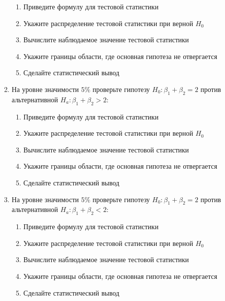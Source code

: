 \documentclass[pdftex,11pt,openany]{book}\usepackage[]{graphicx}\usepackage[]{color}
\begin{document}
\begin{problem}
\begin{enumerate}
\begin{enumerate}
\item Приведите формулу для тестовой статистики 
\item Укажите распределение тестовой статистики при верной $H_0$
\item Вычислите наблюдаемое значение тестовой статистики
\item Укажите границы области, где основная гипотеза не отвергается
\item Сделайте статистический вывод
\end{enumerate}
\item На уровне значимости $5\%$ проверьте гипотезу  $H_0: \beta_1 + \beta_2 = 2$ против альтернативной $H_a: \beta_1 + \beta_2 > 2$:
\begin{enumerate}
\item Приведите формулу для тестовой статистики 
\item Укажите распределение тестовой статистики при верной $H_0$
\item Вычислите наблюдаемое значение тестовой статистики
\item Укажите границы области, где основная гипотеза не отвергается
\item Сделайте статистический вывод
\end{enumerate}
\item На уровне значимости $5\%$ проверьте гипотезу  $H_0: \beta_1 + \beta_2 = 2$ против альтернативной $H_a: \beta_1 + \beta_2 < 2$:
\begin{enumerate}
\item Приведите формулу для тестовой статистики 
\item Укажите распределение тестовой статистики при верной $H_0$
\item Вычислите наблюдаемое значение тестовой статистики
\item Укажите границы области, где основная гипотеза не отвергается
\item Сделайте статистический вывод
\end{enumerate}
\end{enumerate}
\end{problem}
\end{document}
